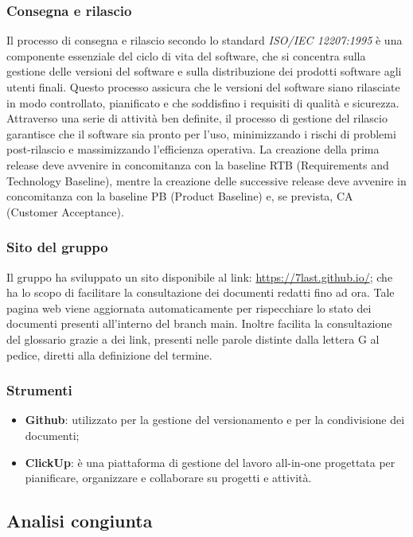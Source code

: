 \subsubsection{Consegna e rilascio}
Il processo di consegna e rilascio secondo lo standard \textit{ISO/IEC 12207:1995} è una componente essenziale del ciclo di vita del software, che si concentra sulla gestione delle versioni del software e sulla distribuzione dei prodotti software agli utenti finali. Questo processo assicura che le versioni del software siano rilasciate in modo controllato, pianificato e che soddisfino i requisiti di qualità e sicurezza. Attraverso una serie di attività ben definite, il processo di gestione del rilascio garantisce che il software sia pronto per l'uso, minimizzando i rischi di problemi post-rilascio e massimizzando l'efficienza operativa. La creazione della prima release deve avvenire in concomitanza con la baseline RTB (Requirements and Technology Baseline), mentre la creazione delle successive release deve avvenire in concomitanza con la baseline PB (Product Baseline) e, se prevista, CA (Customer Acceptance).

\subsubsection{Sito del gruppo}
Il gruppo ha sviluppato un sito disponibile al link: \url{https://7last.github.io/}; che ha lo scopo di facilitare la consultazione dei documenti redatti fino ad ora. Tale pagina web viene aggiornata automaticamente per rispecchiare lo stato dei documenti presenti all'interno del branch main. Inoltre facilita la consultazione del glossario grazie a dei link, presenti nelle parole distinte dalla lettera G al pedice, diretti alla definizione del termine.

\subsubsection{Strumenti} 

\begin{itemize}
	\item \textbf{Github}: utilizzato per la gestione del versionamento e per la condivisione dei documenti;
	\item \textbf{ClickUp}: è una piattaforma di gestione del lavoro all-in-one progettata per pianificare, organizzare e collaborare su progetti e attività.
\end{itemize}


\subsection{Analisi congiunta}
